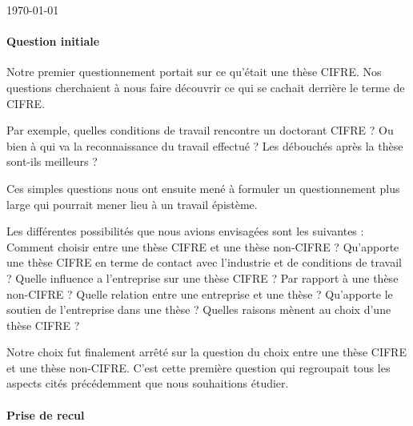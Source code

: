 \documentclass[12pt]{article}
\begin{document}
\begin{titlepage}
	\vfill
	
	\begin{center}
    \end{center}
	
	\vfill\vfill %
	
	{\large\today} %

	
	
	\vfill %
	
\end{titlepage}

\paragraph{Question initiale} %

Notre premier questionnement portait sur ce qu'était une thèse CIFRE. Nos questions cherchaient à nous faire découvrir ce qui se cachait derrière le terme de CIFRE.

Par exemple, quelles conditions de travail rencontre un doctorant CIFRE ? Ou bien à qui va la reconnaissance du travail effectué ? Les débouchés après la thèse sont-ils meilleurs ?

Ces simples questions nous ont ensuite mené à formuler un questionnement plus large qui pourrait mener lieu à un travail épistème.

Les différentes possibilités que nous avions envisagées sont les suivantes : 
Comment choisir entre une thèse CIFRE et une thèse non-CIFRE ?
Qu'apporte une thèse CIFRE en terme de contact avec l'industrie et de conditions de travail ?
Quelle influence a l'entreprise sur une thèse CIFRE ? Par rapport à une thèse non-CIFRE ?
Quelle relation entre une entreprise et une thèse ?
Qu'apporte le soutien de l'entreprise dans une thèse ?
Quelles raisons mènent au choix d'une thèse CIFRE ?

Notre choix fut finalement arrêté sur la question du choix entre une thèse CIFRE et une thèse non-CIFRE. C'est cette première question qui regroupait tous les aspects cités précédemment que nous souhaitions étudier.

\paragraph{Prise de recul}
\end{document}
